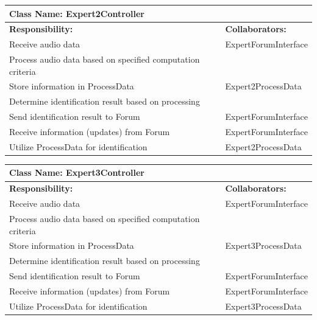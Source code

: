 \documentclass[]{article}
\begin{document}
\newpage
	\begin{table}[ht]
		\centering
		\begin{tabular}{|p{5cm}|p{5cm}|}
		\hline 
		 \multicolumn{2}{|l|}{\textbf{Class Name: Expert2Controller}} \\
		\hline
		\textbf{Responsibility:} & \textbf{Collaborators:} \\
		\hline
		Receive audio data & ExpertForumInterface \\
		\hline
		Process audio data based on specified computation criteria &  \\
		\hline
		Store information in ProcessData & Expert2ProcessData \\
		\hline
		Determine identification result based on processing &  \\
		\hline
		Send identification result to Forum & ExpertForumInterface \\
		\hline
		Receive information (updates) from Forum & ExpertForumInterface \\
		\hline
		Utilize ProcessData for identification & Expert2ProcessData \\
		\hline
		\end{tabular}
	\end{table}

	\begin{table}[ht]
		\centering
		\begin{tabular}{|p{5cm}|p{5cm}|}
		\hline 
		 \multicolumn{2}{|l|}{\textbf{Class Name: Expert3Controller}} \\
		\hline
		\textbf{Responsibility:} & \textbf{Collaborators:} \\
		\hline
		Receive audio data & ExpertForumInterface \\
		\hline
		Process audio data based on specified computation criteria &  \\
		\hline
		Store information in ProcessData & Expert3ProcessData \\
		\hline
		Determine identification result based on processing &  \\
		\hline
		Send identification result to Forum & ExpertForumInterface \\
		\hline
		Receive information (updates) from Forum & ExpertForumInterface \\
		\hline
		Utilize ProcessData for identification & Expert3ProcessData \\
		\hline
		\end{tabular}
	\end{table}	
	
\end{document}

